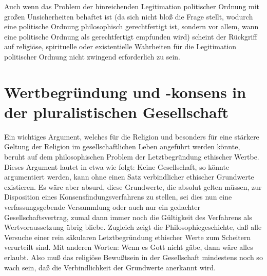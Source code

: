 
Auch wenn das Problem der hinreichenden Legitimation politischer Ordnung mit
großen Unsicherheiten behaftet ist (da sich nicht bloß die Frage stellt,
wodurch eine politische Ordnung philosophisch gerechtfertigt ist, sondern vor
allem, wann eine politische Ordnung als gerechtfertigt empfunden wird) scheint
der Rückgriff auf religiöse, spirituelle oder existentielle Wahrheiten für die
Legitimation politischer Ordnung nicht zwingend erforderlich zu sein.

\section{Wertbegründung und -konsens in der pluralistischen
  Gesellschaft} 

Ein wichtiges Argument, welches für die Religion und besonders für eine
stärkere Geltung der Religion im gesellschaftlichen Leben angeführt
werden könnte, beruht auf dem philosophischen Problem der
Letztbegründung ethischer Wertbe. Dieses Argument lautet in etwa wie
folgt: Keine Gesellschaft, so könnte argumentiert werden, kann ohne
einen Satz verbindlicher ethischer Grundwerte existieren. Es wäre aber
absurd, diese Grundwerte, die absolut gelten müssen, zur Disposition
eines Konsensfindungsverfahrens zu stellen, sei dies nun eine
verfassungsgebende Versammlung oder auch nur ein gedachter
Gesellschaftsvertrag, zumal dann immer noch die Gültigkeit des
Verfahrens als Wertvoraussetzung übrig bliebe. Zugleich zeigt die
Philosophiegeschichte, daß alle Versuche einer rein säkularen
Letztbegründung ethischer Werte zum Scheitern verurteilt sind. Mit
anderen Worten: Wenn es Gott nicht gäbe, dann wäre alles erlaubt. Also
muß das religiöse Bewußtsein in der Gesellschaft mindestens noch so wach
sein, daß die Verbindlichkeit der Grundwerte anerkannt wird.

